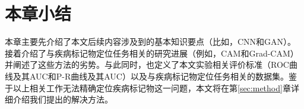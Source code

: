 
\section{本章小结}
本章主要先介绍了本文后续内容涉及到的基本知识要点（比如，CNN和GAN）。接着介绍了与疾病标记物定位任务相关的研究进展（例如，CAM和Grad-CAM）并阐述了这些方法的劣势。与此同时，也定义了本文实验相关评价标准（ROC曲线及其AUC和P-R曲线及其AUC）以及与疾病标记物定位任务相关的数据集。鉴于以上相关工作无法精确定位疾病标记物这一问题，本文将在第\ref{sec:method}章详细介绍我们提出的解决方法。

